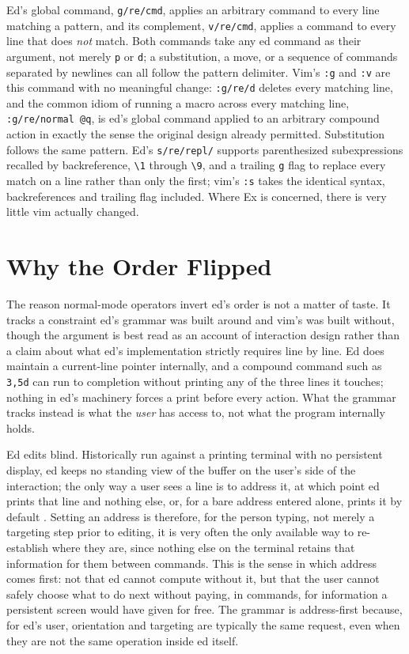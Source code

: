 \documentclass[11pt]{article}
\begin{document}
Ed's global command, \texttt{g/re/cmd}, applies an arbitrary command to every line matching a pattern, and its complement, \texttt{v/re/cmd}, applies a command to every line that does \emph{not} match. Both commands take any ed command as their argument, not merely \texttt{p} or \texttt{d}; a substitution, a move, or a sequence of commands separated by newlines can all follow the pattern delimiter. Vim's \texttt{:g} and \texttt{:v} are this command with no meaningful change: \texttt{:g/re/d} deletes every matching line, and the common idiom of running a macro across every matching line, \texttt{:g/re/normal @q}, is ed's global command applied to an arbitrary compound action in exactly the sense the original design already permitted. Substitution follows the same pattern. Ed's \texttt{s/re/repl/} supports parenthesized subexpressions recalled by backreference, \texttt{\textbackslash1} through \texttt{\textbackslash9}, and a trailing \texttt{g} flag to replace every match on a line rather than only the first; vim's \texttt{:s} takes the identical syntax, backreferences and trailing flag included. Where Ex is concerned, there is very little vim actually changed.

\section{Why the Order Flipped}

The reason normal-mode operators invert ed's order is not a matter of taste. It tracks a constraint ed's grammar was built around and vim's was built without, though the argument is best read as an account of interaction design rather than a claim about what ed's implementation strictly requires line by line. Ed does maintain a current-line pointer internally, and a compound command such as \texttt{3,5d} can run to completion without printing any of the three lines it touches; nothing in ed's machinery forces a print before every action. What the grammar tracks instead is what the \emph{user} has access to, not what the program internally holds.

Ed edits blind. Historically run against a printing terminal with no persistent display, ed keeps no standing view of the buffer on the user's side of the interaction; the only way a user sees a line is to address it, at which point ed prints that line and nothing else, or, for a bare address entered alone, prints it by default \cite{lucas2018}. Setting an address is therefore, for the person typing, not merely a targeting step prior to editing, it is very often the only available way to re-establish where they are, since nothing else on the terminal retains that information for them between commands. This is the sense in which address comes first: not that ed cannot compute without it, but that the user cannot safely choose what to do next without paying, in commands, for information a persistent screen would have given for free. The grammar is address-first because, for ed's user, orientation and targeting are typically the same request, even when they are not the same operation inside ed itself.
\end{document}
